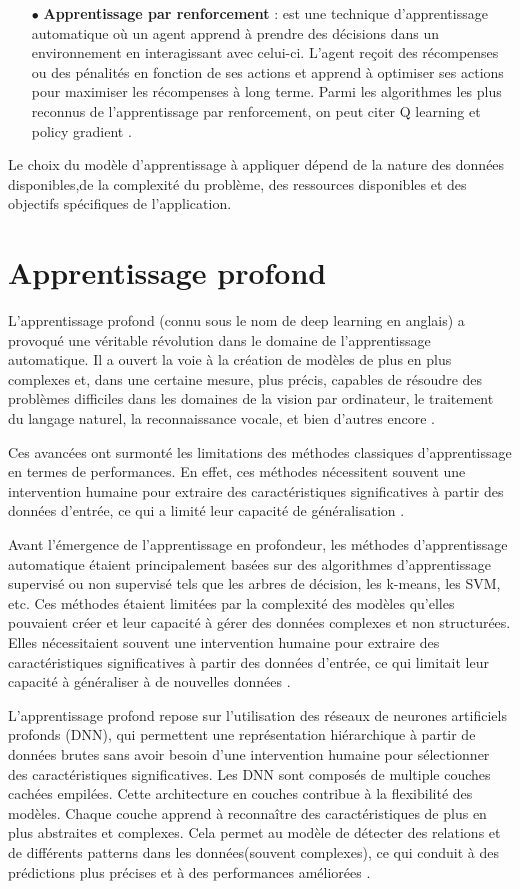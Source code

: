 \begin{enumerate}
\item [$\bullet$] \textbf{Apprentissage par renforcement} : est une technique d'apprentissage automatique où un agent apprend à prendre des décisions dans un environnement en interagissant avec celui-ci. L'agent reçoit des récompenses ou des pénalités en fonction de ses actions et apprend à optimiser ses actions pour maximiser les récompenses à long terme. Parmi les algorithmes les plus reconnus de l'apprentissage par renforcement, on peut citer Q learning \cite{q_learning_01} et policy gradient \cite{policy_gradient_01}.
\end{enumerate}
Le choix du modèle d'apprentissage à appliquer dépend de la nature des données disponibles,de la complexité du problème, des ressources disponibles et des objectifs spécifiques de l'application.
\section{Apprentissage profond}
L'apprentissage profond (connu sous le nom de deep learning en anglais) a provoqué une véritable révolution dans le domaine de l'apprentissage automatique. Il a ouvert la voie à la création de modèles de plus en plus complexes et, dans une certaine mesure, plus précis, capables de résoudre des problèmes difficiles dans les domaines de la vision par ordinateur, le traitement du langage naturel, la reconnaissance vocale, et bien d'autres encore \cite{Deep_learning_lecun2015deep}.

Ces avancées ont surmonté les limitations des méthodes classiques d'apprentissage en termes de performances. En effet, ces méthodes nécessitent souvent une intervention humaine pour extraire des caractéristiques significatives à partir des données d'entrée, ce qui a limité leur capacité de  généralisation \cite{Deep_learning_lecun2015deep}.

Avant l'émergence de l'apprentissage en profondeur, les méthodes d'apprentissage automatique étaient principalement basées sur des algorithmes d'apprentissage supervisé ou non supervisé tels que les arbres de décision, les k-means, les SVM, etc. Ces méthodes étaient limitées par la complexité des modèles qu'elles pouvaient créer et leur capacité à gérer des données complexes et non structurées. Elles nécessitaient souvent une intervention humaine pour extraire des caractéristiques significatives à partir des données d'entrée, ce qui limitait leur capacité à généraliser à de nouvelles données \cite{Deep_learning_lecun2015deep}.

L'apprentissage profond repose sur l'utilisation des réseaux de neurones artificiels profonds (DNN), qui permettent une représentation hiérarchique à partir de données brutes sans avoir besoin d'une intervention humaine pour sélectionner des caractéristiques significatives. 
Les DNN sont composés de  multiple couches cachées empilées. Cette architecture en couches contribue à la flexibilité des modèles. Chaque couche apprend à reconnaître des caractéristiques de plus en plus abstraites et complexes. Cela permet au modèle de détecter des relations et de différents patterns dans les données(souvent complexes), ce qui conduit à des prédictions plus précises et à des performances améliorées \cite{Deep_learning_lecun2015deep}.

